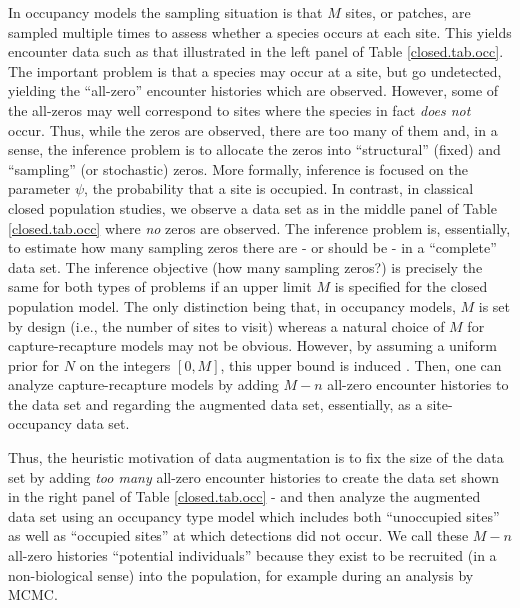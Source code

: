 In occupancy models \citep{mackenzie_etal:2002, tyre_etal:2003} the
sampling situation is that $M$ sites, or patches, are sampled multiple
times to assess whether a species occurs at each site.  This yields
encounter data such as that illustrated in the left panel of Table
\ref{closed.tab.occ}. The important problem is that a species may occur at
a site, but go undetected, yielding the ``all-zero'' encounter
histories which are observed. However, some of the all-zeros may well
correspond to sites where the species in fact {\it does not}
occur. Thus, while the zeros are observed, there are too many of them
and, in a sense, the inference problem is to allocate the zeros into
``structural'' (fixed) and ``sampling'' (or stochastic) zeros. More
formally, inference is focused on the parameter $\psi$, the
probability that a site is occupied.  In contrast, in classical closed
population studies, we observe a data set as in the middle panel of
Table \ref{closed.tab.occ} where {\it no} zeros are observed. The inference
problem is, essentially, to estimate how many sampling zeros there are
- or should be - in a ``complete'' data set. The inference objective
(how many sampling zeros?) is precisely the same for both types of
problems if an upper limit $M$ is specified for the closed population
model. The only distinction being that, in occupancy models, $M$ is
set by design (i.e., the number of sites to visit) whereas a natural
choice of $M$ for capture-recapture models may not be
obvious. However, by assuming a uniform prior for $N$ on the integers
$[0,M]$, this upper bound is induced \citep{royle_etal:2007}. Then,
one can analyze capture-recapture models by adding $M-n$ all-zero
encounter histories to the data set and regarding the augmented data
set, essentially, as a site-occupancy data set.

Thus, the heuristic motivation of data augmentation is to fix the size
of the data set by adding {\it too many} all-zero encounter histories
to create the data set shown in the right panel of Table
\ref{closed.tab.occ} - and then analyze the augmented data set using an
occupancy type model which includes both ``unoccupied sites'' as well
as ``occupied sites'' at which detections did not occur. We call these
$M-n$ all-zero histories ``potential individuals'' because they exist
to be recruited (in a non-biological sense) into the population, for
example during an analysis by MCMC.

